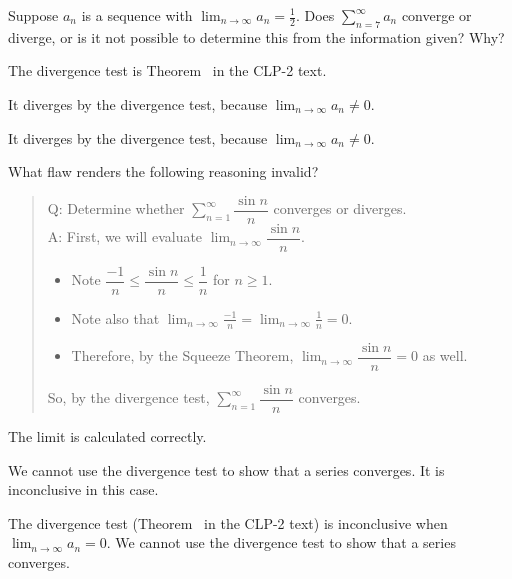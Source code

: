 \begin{question}
Suppose $a_n$ is a sequence with $\displaystyle\lim_{n \to \infty}a_n = \frac{1}{2}$. Does $\displaystyle\sum_{n=7}^\infty a_n$ converge or diverge, or is it not possible to determine this from the information given? Why?
\end{question}
\begin{hint}
The divergence test is Theorem~ in the CLP-2 text.
\end{hint}
\begin{answer}
It diverges by the divergence test, because $\displaystyle\lim_{n \to \infty}a_n \neq 0$.
\end{answer}
\begin{solution}
It diverges by the divergence test, because $\displaystyle\lim_{n \to \infty}a_n \neq 0$.
\end{solution}



\begin{Mquestion}
What flaw renders the following reasoning invalid?
\begin{quote}\color{blue}
Q: Determine whether $\displaystyle\sum_{n=1}^\infty \dfrac{\sin n}{n}$ converges or diverges.\\
A: First, we will evaluate $\displaystyle\lim_{n \to \infty} \dfrac{\sin n}{n}$.
\begin{itemize}
\item Note $\dfrac{-1}{n} \leq \dfrac{\sin n}{n} \leq \dfrac{1}{n}$ for $n \ge 1$.
\item Note also that $\displaystyle\lim_{n \to \infty}\frac{-1}{n}=\displaystyle\lim_{n \to \infty}\frac{1}{n}=0$.
\item Therefore, by the Squeeze Theorem, $\displaystyle\lim_{n \to \infty} \dfrac{\sin n}{n}=0$ as well.
\end{itemize}
So, by the divergence test, $\displaystyle\sum_{n=1}^\infty \dfrac{\sin n}{n}$ converges.
\end{quote}
\end{Mquestion}
\begin{hint}
The limit is calculated correctly.
\end{hint}
\begin{answer}
We cannot use the divergence test to show that a series converges. It is inconclusive in this case.
\end{answer}
\begin{solution}
 The divergence test (Theorem~ in the CLP-2 text) is inconclusive when $\displaystyle\lim_{n \to \infty}a_n=0$. We cannot use the divergence test to show that a series converges.
\end{solution}



